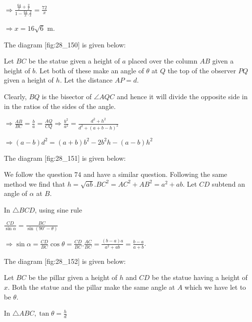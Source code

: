   $\Rightarrow \frac{\frac{64}{x} + \frac{2}{x}}{1 - \frac{64}{x}.\frac{2}{x}} = \frac{72}{x}$

  $\Rightarrow x = 16\sqrt{6}$ m.

\item The diagram [fig:28_150] is given below:

  \startplacefigure[reference=fig:28_150]
    \externalfigure[28_150.pdf]
  \stopplacefigure

  Let $BC$ be the statue given a height of $a$ placed over the column $AB$ given a
  height of $b$. Let both of these make an angle of $\theta$ at $Q$ the top of the
  observer $PQ$ given a height of $h$. Let the distance $AP = d$.

  Clearly, $BQ$ is the bisector of $\angle AQC$ and hence it will divide the opposite side in
  in the ratios of the sides of the angle.

  $\Rightarrow \frac{AB}{BC} = \frac{b}{a} = \frac{AQ}{CQ} \Rightarrow \frac{b^2}{a^2} =
  \frac{d^2 + h^2}{d^2 + (a + b - h)^2}$

  $\Rightarrow (a - b)d^2 = (a + b)b^2 - 2b^2h - (a - b)h^2$
\item The diagram [fig:28_151] is given below:

  \startplacefigure[reference=fig:28_151]
    \externalfigure[28_151.pdf]
  \stopplacefigure

  We follow the question $74$ and have a similar question. Following the same method we find that
  $h = \sqrt{ab}. BC^2 = AC^2 + AB^2 = a^2 + ab$. Let $CD$ subtend an angle of $\alpha$
  at $B$.

  In $\triangle BCD$, using sine rule

  $\frac{CD}{\sin\alpha} = \frac{BC}{\sin(90^\circ - \theta)}$

  $\Rightarrow \sin\alpha = \frac{CD}{BC}\cos\theta = \frac{CD}{BC}.\frac{AC}{BC} = \frac{(b -
    a)a}{a^2 + ab} = \frac{b - a}{a + b}$.

\item The diagram [fig:28_152] is given below:

  \startplacefigure[reference=fig:28_152]
    \externalfigure[28_152.pdf]
  \stopplacefigure

  Let $BC$ be the pillar given a height of $h$ and $CD$ be the statue having a height
  of $x$. Both the statue and the pillar make the same angle at $A$ which we have let to be
  $\theta$.

  In $\triangle ABC, \tan\theta = \frac{h}{d}$

